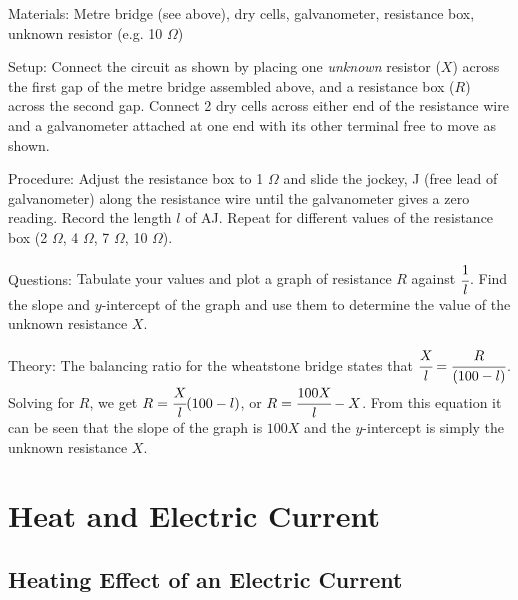 \begin{multicols}{2}
\begin{description*}
\item[Materials:]{Metre bridge (see above), dry cells, galvanometer, resistance box, unknown resistor (e.g. 10 $\Omega$)}
\item[Setup:]{Connect the circuit as shown by placing one \emph{unknown} resistor ($X$) across the first gap of the metre bridge assembled above, and a resistance box ($R$) across the second gap. Connect 2 dry cells across either end of the resistance wire and a galvanometer attached at one end with its other terminal free to move as shown.}
\item[Procedure:]{Adjust the resistance box to 1 $\Omega$ and slide the jockey, J (free lead of galvanometer) along the resistance wire until the galvanometer gives a zero reading. Record the length $l$ of AJ. Repeat for different values of the resistance box (2 $\Omega$, 4 $\Omega$, 7 $\Omega$, 10 $\Omega$).}
\item[Questions:]{Tabulate your values and plot a graph of resistance $R$ against $\cfrac{1}{l}$. Find the slope and $y$-intercept of the graph and use them to determine the value of the unknown resistance $X$.}
\item[Theory:]{The balancing ratio for the wheatstone bridge states that $\cfrac{X}{l} = \cfrac{R}{(100-l)}$. Solving for $R$, we get $R = \cfrac{X}{l}(100-l)$, or $R = \cfrac{100X}{l}-X$. From this equation it can be seen that the slope of the graph is $100X$ and the $y$-intercept is simply the unknown resistance $X$.}
\end{description*}

\vfill
\columnbreak


\section*{Heat and Electric Current}


\subsection{Heating Effect of an Electric Current}


\end{multicols}
